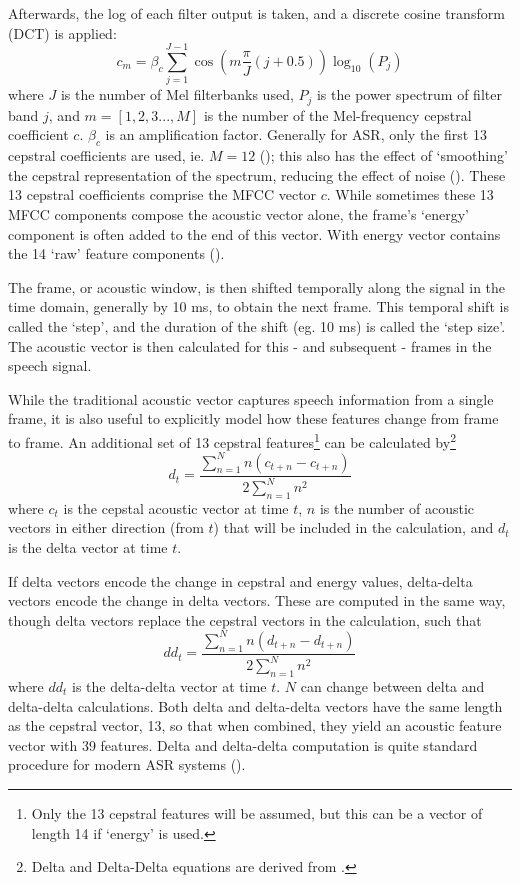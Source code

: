 Afterwards, the log of each filter output is taken, and a discrete cosine transform (DCT) is applied: \begin{equation}\label{eq:mfcc-calculation} c_m = \beta_c \sum_{j=1}^{J-1} \cos(m\dfrac{\pi}{J} (j+0.5)) \log_{10} (P_j) \end{equation} where $J$ is the number of Mel filterbanks used, $P_j$ is the power spectrum of filter band $j$, and $m=[1,2,3...,M]$ is the number of the Mel-frequency cepstral coefficient $c$.  $\beta_c$ is an amplification factor.  Generally for ASR, only the first 13 cepstral coefficients are used, ie. $M=12$ (\cite{etsi:02}); this also has the effect of `smoothing' the cepstral representation of the spectrum, reducing the effect of noise (\cite{gold:11}).  These 13 cepstral coefficients comprise the MFCC vector $c$.  While sometimes these 13 MFCC components compose the acoustic vector alone,  the frame's `energy' component is often added to the end of this vector.  With energy vector contains the 14 `raw' feature components (\cite{etsi:02}).  

The frame, or acoustic window, is then shifted temporally along the signal in the time domain, generally by 10 ms, to obtain the next frame. This temporal shift is called the `step', and the duration of the shift (eg. 10 ms) is called the `step size'.  The acoustic vector is then calculated for this - and subsequent - frames in the speech signal.

While the traditional acoustic vector captures speech information from a single frame, it is also useful to explicitly model how these features change from frame to frame.  An additional set of 13 cepstral features\footnote{Only the 13 cepstral features will be assumed, but this can be a vector of length 14 if `energy' is used.} can be calculated by\footnote{Delta and Delta-Delta equations are derived from \cite{htk:15}.} \begin{equation} d_t = \dfrac{\sum_{n=1}^{N} n(c_{t+n} - c_{t+n})}{2\sum_{n=1}^{N} n^2} \end{equation} where $c_t$ is the cepstal acoustic vector at time $t$, $n$ is the number of acoustic vectors in either direction (from $t$) that will be included in the calculation, and $d_t$ is the delta vector at time $t$.  

If delta vectors encode the change in cepstral and energy values, delta-delta vectors encode the change in delta vectors.  These are computed in the same way, though delta vectors replace the cepstral vectors in the calculation, such that \begin{equation} dd_t = \dfrac{\sum_{n=1}^{N} n(d_{t+n} - d_{t+n})}{2\sum_{n=1}^{N} n^2} \end{equation} where $dd_t$ is the delta-delta vector at time $t$.  $N$ can change between delta and delta-delta calculations. Both delta and delta-delta vectors have the same length as the cepstral vector, 13, so that when combined, they yield an acoustic feature vector with 39 features.  %
Delta and delta-delta computation is quite standard procedure for modern ASR systems (\cite{htk:15}).



